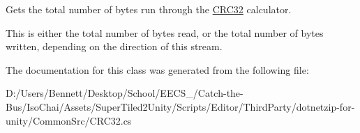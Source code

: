 Gets the total number of bytes run through the \mbox{\hyperlink{class_super_tiled2_unity_1_1_ionic_1_1_crc_1_1_c_r_c32}{C\+R\+C32}} calculator. 

This is either the total number of bytes read, or the total number of bytes written, depending on the direction of this stream. 

The documentation for this class was generated from the following file\+:\begin{DoxyCompactItemize}
\item 
D\+:/\+Users/\+Bennett/\+Desktop/\+School/\+E\+E\+C\+S\+\_/\+Catch-\/the-\/\+Bus/\+Iso\+Chai/\+Assets/\+Super\+Tiled2\+Unity/\+Scripts/\+Editor/\+Third\+Party/dotnetzip-\/for-\/unity/\+Common\+Src/C\+R\+C32.\+cs\end{DoxyCompactItemize}
